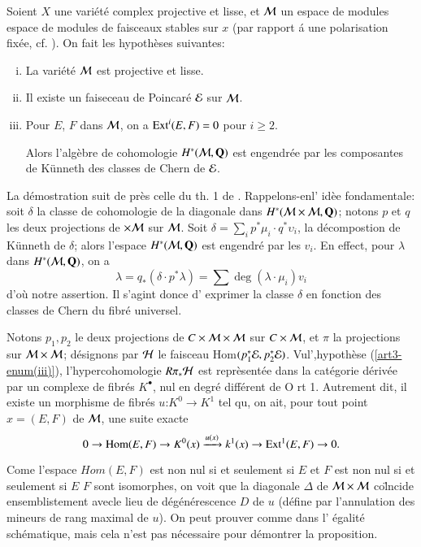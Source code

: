 \begin{prop*}
Soient $X$ une vari\'et\'e complex projective et lisse, et $\mathcal{M}$ un espace de modules espace de modules de faisceaux stables sur $x$ (par rapport \'a une polarisation fix\'ee, cf. \cite{art3-keyM}). On fait les hypoth\`eses suivantes:
\begin{enumerate}[(i)]
\item La vari\'et\'e $\mathcal{M}$ est projective et lisse.\label{art3-enum(i)}
\item Il existe un faiseceau de Poincar\'e $\mathcal{E}$ sur $\mathcal{M}$.\label{art3-enum(ii)}
\item Pour $E$, $F$ dans $\mathcal{M}$, on a $\operatorname{Ext}^{i}(E, F) =0$ pour $i\geq 2$.\label{art3-enum(iii)}

Alors l'alg\`ebre de cohomologie $H^{*}(\mathcal{M}, \mathbf{Q})$ est engendr\'ee par les composantes de K\"unneth des classes de Chern de $\mathcal{E}$.   
\end{enumerate}
\end{prop*}

La d\'emostration suit de pr\`es celle du th. 1 de \cite{art3-keyE-S}. Rappelons-enl' id\`ee fondamentale: soit $\delta$ la classe de cohomologie de la diagonale dans $H^{*}(\mathcal{M} \times \mathcal{M}, \mathbf{Q})$; notons $p$ et $q$ les deux projections de $\cal \times M$ sur $\mathcal{M}$. Soit $\delta = \sum\limits_{i}p^{*}\mu_{i} \cdot q^{*} \upsilon_{i}$, la d\'ecompostion de K\"unneth de $\delta$; alors l'espace $H^{*}(\mathcal{M}, \mathbf{Q})$ est engendr\'e par les $v_{i}$. En effect, pour $\lambda$ dans $H^{*}(\mathcal{M}, \mathbf{Q})$, on a
$$
\lambda = q_{*}(\delta \cdot p^{*}\lambda) = \sum\deg(\lambda \cdot \mu_{i})v_{i}
$$
d'o\`u notre assertion. Il s'agint donce d' exprimer la classe $\delta$ en fonction des classes de Chern du fibr\'e universel.

Notons $p_{1}, p_{2}$ le deux projections de $C\times \mathcal{M} \times \mathcal{M}$ sur $C \times \mathcal{M}$, et $\pi$ la projections sur  $\mathcal{M} \times \mathcal{M}$; d\'esignons par $\mathcal{H}$ le faisceau Hom$(p_{1}^{*}\mathcal{E}, p_{2}^{*}\mathcal{E})$. Vul',hypoth\`ese (\ref{art3-enum(iii)}), l'hypercohomologie $R\pi_{*}\mathcal{H}$ est repr\`esent\'ee dans la cat\'egorie d\'eriv\'ee par un complexe de fibr\'es $K^{\bullet}$, nul en degr\'e diff\'erent de O rt 1. Autrement dit, il existe un morphisme de fibr\'es $u$:$K^{0}\longrightarrow K^{1}$ tel qu, on ait, pour tout point $x=(E, F)$ de $\mathcal{M}$, une suite exacte
$$
0 \rightarrow \operatorname{Hom}(E, F) \rightarrow  K^{0}(x)\xrightarrow{u(x)}k^{1}(x)\rightarrow \operatorname{Ext}^{1}(E, F) \rightarrow 0.
$$

Come l'espace $Hom(E, F)$ est non nul si et seulement si $E$ et $F$ est non nul si et seulement si $E$ $F$ sont isomorphes, on voit que la diagonale $\Delta$ de $\mathcal{M} \times \mathcal{M}$ co\"lncide ensemblistement avecle lieu de d\'eg\'en\'erescence $D$ de $u$ (d\'efine par l'annulation des mineurs de rang maximal de $u$). On peut prouver comme dans \cite{art3-keyE-S} l' \'egalit\'e sch\'ematique, mais cela n'est pas n\'ecessaire pour d\'emontrer la proposition. 

